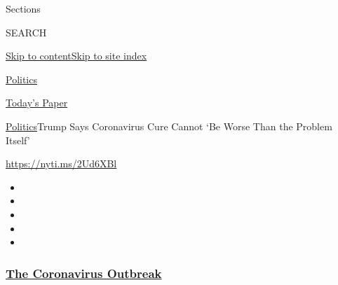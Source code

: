 Sections

SEARCH

\protect\hyperlink{site-content}{Skip to
content}\protect\hyperlink{site-index}{Skip to site index}

\href{https://www.nytimes3xbfgragh.onion/section/politics}{Politics}

\href{https://myaccount.nytimes3xbfgragh.onion/auth/login?response_type=cookie\&client_id=vi}{}

\href{https://www.nytimes3xbfgragh.onion/section/todayspaper}{Today's
Paper}

\href{/section/politics}{Politics}\textbar{}Trump Says Coronavirus Cure
Cannot `Be Worse Than the Problem Itself'

\url{https://nyti.ms/2Ud6XBl}

\begin{itemize}
\item
\item
\item
\item
\item
\end{itemize}

\hypertarget{the-coronavirus-outbreak}{%
\subsubsection{\texorpdfstring{\href{https://www.nytimes3xbfgragh.onion/news-event/coronavirus?name=styln-coronavirus-national\&region=TOP_BANNER\&block=storyline_menu_recirc\&action=click\&pgtype=Article\&impression_id=28c3cc60-f299-11ea-9ee4-4b0f9d7721fd\&variant=undefined}{The
Coronavirus
Outbreak}}{The Coronavirus Outbreak}}\label{the-coronavirus-outbreak}}


